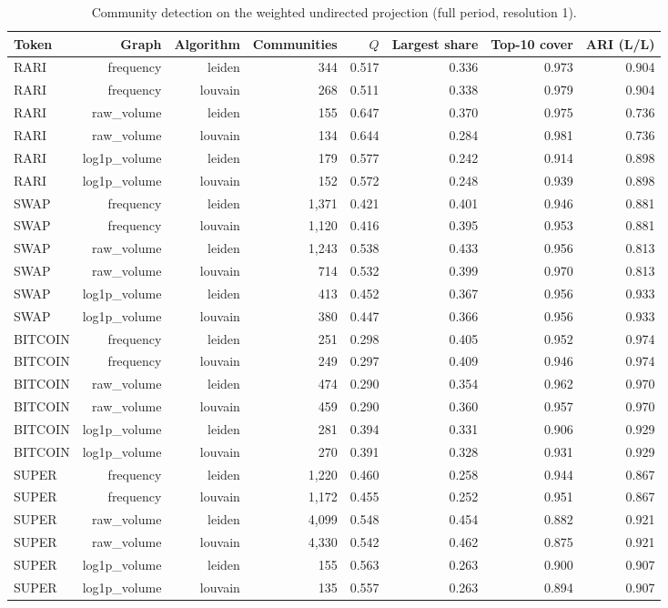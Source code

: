 \begin{table}[t]
\centering
\small
\caption{Community detection on the weighted undirected projection (full period, resolution 1).}
\label{tab:communities}
\begin{tabular}{lrrrrrrr}
\toprule
Token & Graph & Algorithm & Communities & $Q$ & Largest share & Top-10 cover & ARI (L/L) \\
\midrule
RARI & frequency & leiden & 344 & 0.517 & 0.336 & 0.973 & 0.904 \\
RARI & frequency & louvain & 268 & 0.511 & 0.338 & 0.979 & 0.904 \\
RARI & raw\_volume & leiden & 155 & 0.647 & 0.370 & 0.975 & 0.736 \\
RARI & raw\_volume & louvain & 134 & 0.644 & 0.284 & 0.981 & 0.736 \\
RARI & log1p\_volume & leiden & 179 & 0.577 & 0.242 & 0.914 & 0.898 \\
RARI & log1p\_volume & louvain & 152 & 0.572 & 0.248 & 0.939 & 0.898 \\
SWAP & frequency & leiden & 1{,}371 & 0.421 & 0.401 & 0.946 & 0.881 \\
SWAP & frequency & louvain & 1{,}120 & 0.416 & 0.395 & 0.953 & 0.881 \\
SWAP & raw\_volume & leiden & 1{,}243 & 0.538 & 0.433 & 0.956 & 0.813 \\
SWAP & raw\_volume & louvain & 714 & 0.532 & 0.399 & 0.970 & 0.813 \\
SWAP & log1p\_volume & leiden & 413 & 0.452 & 0.367 & 0.956 & 0.933 \\
SWAP & log1p\_volume & louvain & 380 & 0.447 & 0.366 & 0.956 & 0.933 \\
BITCOIN & frequency & leiden & 251 & 0.298 & 0.405 & 0.952 & 0.974 \\
BITCOIN & frequency & louvain & 249 & 0.297 & 0.409 & 0.946 & 0.974 \\
BITCOIN & raw\_volume & leiden & 474 & 0.290 & 0.354 & 0.962 & 0.970 \\
BITCOIN & raw\_volume & louvain & 459 & 0.290 & 0.360 & 0.957 & 0.970 \\
BITCOIN & log1p\_volume & leiden & 281 & 0.394 & 0.331 & 0.906 & 0.929 \\
BITCOIN & log1p\_volume & louvain & 270 & 0.391 & 0.328 & 0.931 & 0.929 \\
SUPER & frequency & leiden & 1{,}220 & 0.460 & 0.258 & 0.944 & 0.867 \\
SUPER & frequency & louvain & 1{,}172 & 0.455 & 0.252 & 0.951 & 0.867 \\
SUPER & raw\_volume & leiden & 4{,}099 & 0.548 & 0.454 & 0.882 & 0.921 \\
SUPER & raw\_volume & louvain & 4{,}330 & 0.542 & 0.462 & 0.875 & 0.921 \\
SUPER & log1p\_volume & leiden & 155 & 0.563 & 0.263 & 0.900 & 0.907 \\
SUPER & log1p\_volume & louvain & 135 & 0.557 & 0.263 & 0.894 & 0.907 \\
\bottomrule
\end{tabular}
\end{table}
